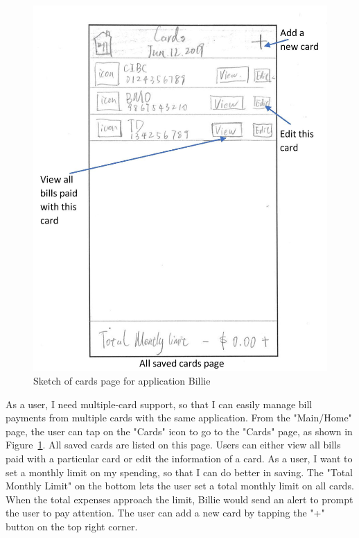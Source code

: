 \documentclass{sigchi}
\begin{document}
\begin{figure}[h!]
\centering
  \includegraphics[width=0.6\columnwidth]{20-card-page.jpg}
  \caption{Sketch of cards page for application Billie}
  \label{fig:figure35}
\end{figure}
As a user, I need multiple-card support, so that I can easily manage bill payments from multiple cards with the same application. From the "Main/Home" page, the user can tap on the "Cards" icon to go to the "Cards" page, as shown in Figure~\ref{fig:figure35}. All saved cards are listed on this page. Users can either view all bills paid with a particular card or edit the information of a card. As a user, I want to set a monthly limit on my spending, so that I can do better in saving. The "Total Monthly Limit" on the bottom lets the user set a total monthly limit on all cards. When the total expenses approach the limit, Billie would send an alert to prompt the user to pay attention. The user can add a new card by tapping the "+" button on the top right corner.
\end{document}
